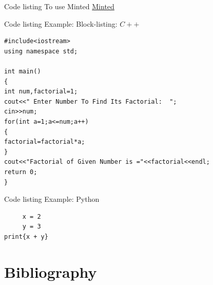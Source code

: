 \documentclass{beamer}
\begin{document}
\begin{darkframes}
\begin{frame}[fragile]{Code listing}
	To use Minted \href{https://www.sharelatex.com/learn/Code_Highlighting_with_minted}{Minted}
\end{frame}

\begin{frame}[fragile]{Code listing}
	Example: Block-listing: $C++$
\begin{verbatim}
#include<iostream>
using namespace std;

int main()
{
int num,factorial=1;
cout<<" Enter Number To Find Its Factorial:  ";
cin>>num;
for(int a=1;a<=num;a++)
{
factorial=factorial*a;
}
cout<<"Factorial of Given Number is ="<<factorial<<endl;
return 0;
}
\end{verbatim}
\end{frame}


\begin{frame}[fragile]{Code listing}
	Example: Python
	\begin{verbatim}
     x = 2
     y = 3
print{x + y}
\end{verbatim}


\end{frame}

\section{Bibliography}


\end{darkframes}
\end{document}
